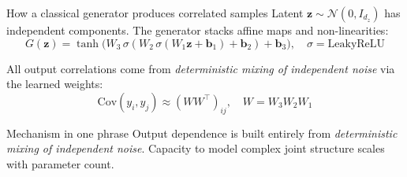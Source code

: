 \begin{frame}{How a classical generator produces correlated samples}
    Latent $\mathbf{z}\sim\mathcal{N}(0,I_{d_z})$ has independent
    components. The generator stacks affine maps and
    non-linearities:
    \[
    G(\mathbf{z}) = \tanh\bigl(W_3\,\sigma(W_2\,
    \sigma(W_1\mathbf{z}+\mathbf{b}_1)+\mathbf{b}_2)
    +\mathbf{b}_3\bigr), \quad \sigma = \text{LeakyReLU}
    \]
    \medskip

    All output correlations come from \emph{deterministic
    mixing of independent noise} via the learned weights:
    \[
    \mathrm{Cov}(y_i, y_j) \approx (W W^\top)_{ij},
    \quad W = W_3 W_2 W_1
    \]
    \medskip

    \begin{block}{Mechanism in one phrase}
        Output dependence is built entirely from
        \emph{deterministic mixing of independent noise}.
        Capacity to model complex joint structure scales with
        parameter count.
    \end{block}
\end{frame}
